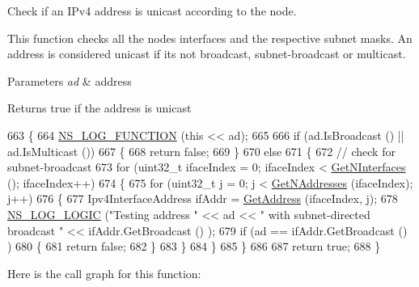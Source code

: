 Check if an I\+Pv4 address is unicast according to the node. 

This function checks all the node\textquotesingle{}s interfaces and the respective subnet masks. An address is considered unicast if it\textquotesingle{}s not broadcast, subnet-\/broadcast or multicast.


\begin{DoxyParams}{Parameters}
{\em ad} & address\\
\hline
\end{DoxyParams}
\begin{DoxyReturn}{Returns}
true if the address is unicast 
\end{DoxyReturn}

\begin{DoxyCode}
663 \{
664   \hyperlink{log-macros-disabled_8h_a90b90d5bad1f39cb1b64923ea94c0761}{NS\_LOG\_FUNCTION} (\textcolor{keyword}{this} << ad);
665 
666   \textcolor{keywordflow}{if} (ad.IsBroadcast () || ad.IsMulticast ())
667     \{
668       \textcolor{keywordflow}{return} \textcolor{keyword}{false};
669     \}
670   \textcolor{keywordflow}{else}
671     \{
672       \textcolor{comment}{// check for subnet-broadcast}
673       \textcolor{keywordflow}{for} (uint32\_t ifaceIndex = 0; ifaceIndex < \hyperlink{classns3_1_1Ipv4L3Protocol_a6ab2be11c0df97f2d1170bbc737c9628}{GetNInterfaces} (); ifaceIndex++)
674         \{
675           \textcolor{keywordflow}{for} (uint32\_t j = 0; j < \hyperlink{classns3_1_1Ipv4L3Protocol_ab816ec1b5f680117bc1363b3d9649b22}{GetNAddresses} (ifaceIndex); j++)
676             \{
677               Ipv4InterfaceAddress ifAddr = \hyperlink{classns3_1_1Ipv4L3Protocol_a85fa4287313a773dee29aa73fa74a7e0}{GetAddress} (ifaceIndex, j);
678               \hyperlink{group__logging_ga88acd260151caf2db9c0fc84997f45ce}{NS\_LOG\_LOGIC} (\textcolor{stringliteral}{"Testing address "} << ad << \textcolor{stringliteral}{" with subnet-directed broadcast "} << 
      ifAddr.GetBroadcast () );
679               \textcolor{keywordflow}{if} (ad == ifAddr.GetBroadcast () )
680                 \{
681                   \textcolor{keywordflow}{return} \textcolor{keyword}{false};
682                 \}
683             \}
684         \}
685     \}
686 
687   \textcolor{keywordflow}{return} \textcolor{keyword}{true};
688 \}
\end{DoxyCode}


Here is the call graph for this function\+:


